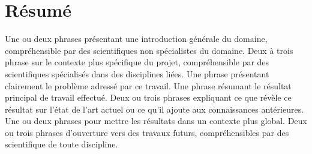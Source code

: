 \chapter*{\Large \center Résumé}


Une ou deux phrases présentant une introduction générale du domaine, compréhensible par des scientifiques non spécialistes du domaine.
Deux à trois phrase sur le contexte plus spécifique du projet, compréhensible par des scientifiques spécialisés dans des disciplines liées.
Une phrase présentant clairement le problème adressé par ce travail.
Une phrase résumant le résultat principal de travail effectué.
Deux ou trois phrases expliquant ce que révèle ce résultat sur l'état de l'art actuel ou ce qu'il ajoute aux connaissances antérieures.
Une ou deux phrases pour mettre les résultats dans un contexte plus global.
Deux ou trois phrases d'ouverture vers des travaux futurs, compréhensibles par des scientifique de toute discipline.

